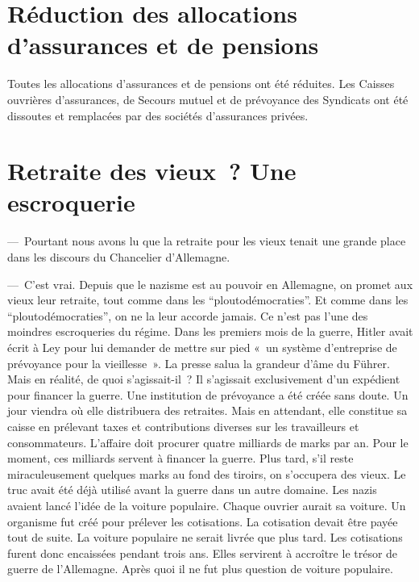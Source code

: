 \documentclass[french,twoside]{book} %
\begin{document}
\section[{Réduction des allocations d’assurances et de pensions}]{Réduction des allocations d’assurances et de pensions}
\noindent Toutes les allocations d’assurances et de pensions ont été réduites. Les Caisses ouvrières d’assurances, de Secours mutuel et de prévoyance des Syndicats ont été dissoutes et remplacées par des sociétés d’assurances privées.
\section[{Retraite des vieux ? Une escroquerie}]{Retraite des vieux ? Une escroquerie}
\noindent — Pourtant nous avons lu que la retraite pour les vieux tenait une grande place dans les discours du Chancelier d’Allemagne.\par
— C’est vrai. Depuis que le nazisme est au pouvoir en Allemagne, on promet aux vieux leur retraite, tout comme dans les “ploutodémocraties”. Et comme dans les “ploutodémocraties”, on ne la leur accorde jamais. Ce n’est pas l’une des moindres escroqueries du régime. Dans les premiers mois de la guerre, Hitler avait écrit à Ley pour lui demander de mettre sur pied « un système d’entreprise de prévoyance pour la vieillesse ». La presse salua la grandeur d’âme du Führer. Mais en réalité, de quoi s’agissait-il ? Il s’agissait exclusivement d’un expédient pour financer la guerre. Une institution de prévoyance a été créée sans doute. Un jour viendra où elle distribuera des retraites. Mais en attendant, elle constitue sa caisse en prélevant taxes et contributions diverses sur les travailleurs et consommateurs. L’affaire doit procurer quatre milliards de marks par an. Pour le moment, ces milliards servent à financer la guerre. Plus tard, s’il reste miraculeusement quelques marks au fond des tiroirs, on s’occupera des vieux. Le truc avait été déjà utilisé avant la guerre dans un autre domaine. Les nazis avaient lancé l’idée de la voiture populaire. Chaque ouvrier aurait sa voiture. Un organisme fut créé pour prélever les cotisations. La cotisation devait être payée tout de suite. La voiture populaire ne serait livrée que plus tard. Les cotisations furent donc encaissées pendant trois ans. Elles servirent à accroître le trésor de guerre de l’Allemagne. Après quoi il ne fut plus question de voiture populaire.
\end{document}
